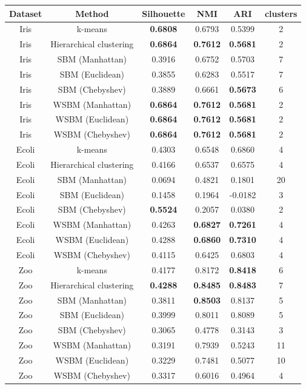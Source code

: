 \documentclass[conference]{IEEEtran}
\begin{document}
\begin{table}[t]
  \centering
  \begin{tabular}{c | c | c c c | c}
    Dataset & Method & Silhouette & NMI & ARI & clusters \\ \hline
    Iris & k-means & \textbf{0.6808} & 0.6793 & 0.5399 & 2 \\
    Iris & Hierarchical clustering & \textbf{0.6864} & \textbf{0.7612} & \textbf{0.5681} & 2 \\
    Iris & SBM (Manhattan) & 0.3916 & 0.6752 & 0.5703 & 7 \\
    Iris & SBM (Euclidean) & 0.3855 & 0.6283 & 0.5517 & 7 \\
    Iris & SBM (Chebyshev) & 0.3889 & 0.6661 & \textbf{0.5673} & 6 \\
    Iris & WSBM (Manhattan) & \textbf{0.6864} & \textbf{0.7612} & \textbf{0.5681} & 2 \\
    Iris & WSBM (Euclidean) & \textbf{0.6864} & \textbf{0.7612} & \textbf{0.5681} & 2 \\
    Iris & WSBM (Chebyshev) & \textbf{0.6864} & \textbf{0.7612} & \textbf{0.5681} & 2 \\

    \hline
    Ecoli & k-means & 0.4303 & 0.6548 & 0.6860 & 4 \\
    Ecoli & Hierarchical clustering & 0.4166 & 0.6537 & 0.6575 & 4 \\
    Ecoli & SBM (Manhattan) & 0.0694 & 0.4821 & 0.1801 & 20 \\
    Ecoli & SBM (Euclidean) & 0.1458 & 0.1964 & -0.0182 & 3 \\
    Ecoli & SBM (Chebyshev) & \textbf{0.5524} & 0.2057 & 0.0380 & 2 \\
    Ecoli & WSBM (Manhattan) & 0.4263 & \textbf{0.6827} & \textbf{0.7261} & 4 \\
    Ecoli & WSBM (Euclidean) & 0.4288 & \textbf{0.6860} & \textbf{0.7310} & 4 \\
    Ecoli & WSBM (Chebyshev) & 0.4115 & 0.6425 & 0.6803 & 4 \\

    \hline
    Zoo & k-means & 0.4177 & 0.8172 & \textbf{0.8418} & 6 \\
    Zoo & Hierarchical clustering & \textbf{0.4288} & \textbf{0.8485} & \textbf{0.8483} & 7 \\
    Zoo & SBM (Manhattan) & 0.3811 & \textbf{0.8503} & 0.8137 & 5 \\
    Zoo & SBM (Euclidean) & 0.3999 & 0.8011 & 0.8089 & 5 \\
    Zoo & SBM (Chebyshev) & 0.3065 & 0.4778 & 0.3143 & 3 \\
    Zoo & WSBM (Manhattan) & 0.3191 & 0.7939 & 0.5243 & 11 \\
    Zoo & WSBM (Euclidean) & 0.3229 & 0.7481 & 0.5077 & 10 \\
    Zoo & WSBM (Chebyshev) & 0.3317 & 0.6016 & 0.4964 & 4 \\


\end{tabular}
\end{table}
\end{document}
